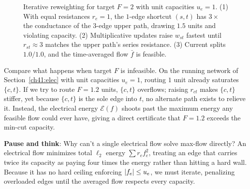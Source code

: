 \begin{figure}[htbp]
\caption{Iterative reweighting for target $F = 2$ with unit capacities $u_e = 1$. (1) With equal resistances $r_e = 1$, the $1$-edge shortcut $(s,t)$ has $3\times$ the conductance of the $3$-edge upper path, drawing $1.5$ units and violating capacity. (2) Multiplicative updates raise $w_{st}$ fastest until $r_{st} \approx 3$ matches the upper path's series resistance. (3) Current splits $1.0 / 1.0$, and the time-averaged flow $\bar{f}$ is feasible.}
\label{ch41:fig-mwu-reroute}
\end{figure}

\begin{intuitionbox}
Compare what happens when target $F$ is infeasible. On the running network of Section~\ref{ch41:elec} with unit capacities $u_e = 1$, routing $1$ unit already saturates $\{c,t\}$. If we try to route $F = 1.2$ units, $\{c,t\}$ overflows; raising $r_{ct}$ makes $\{c,t\}$ stiffer, yet because $\{c,t\}$ is the sole edge into $t$, no alternate path exists to relieve it. Instead, the electrical energy $\mathcal{E}(f)$ shoots past the maximum energy any feasible flow could ever have, giving a direct certificate that $F = 1.2$ exceeds the min-cut capacity.
\end{intuitionbox}

\begin{recoverybox}
\textbf{Pause and think}: Why can't a single electrical flow solve max-flow directly? An electrical flow minimizes total $\ell_2$ energy $\sum r_e f_e^2$, treating an edge that carries twice its capacity as paying four times the energy rather than hitting a hard wall. Because it has no hard ceiling enforcing $\lvert f_e\rvert \le u_e$, we must iterate, penalizing overloaded edges until the averaged flow respects every capacity.
\end{recoverybox}

